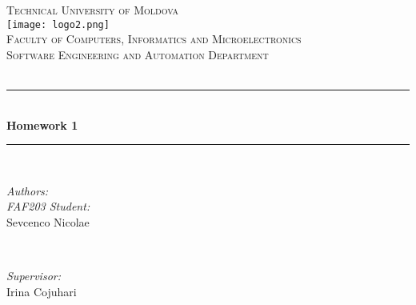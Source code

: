 \documentclass[12pt]{article}
\begin{document}
\begin{titlepage}

    \newcommand{\HRule}{\rule{\linewidth}{0.5mm}} %

    \center %


    \textsc{\LARGE Technical University of Moldova}\\[1.5cm] %
    \texttt{[image: logo2.png]}\\[1cm] %
    \textsc{\Large Faculty of Computers, Informatics and Microelectronics  \\ Software Engineering and Automation Department}\\[0.5cm] %
    \textsc{\large }\\[0.5cm] %


    \HRule \\[0.4cm]
    { \huge \bfseries Homework 1 }\\[0.4cm] %
    \HRule \\[1.5cm]


    \begin{minipage}{0.4\textwidth}
        \begin{flushleft} \large
            \emph{Authors:}\\
            \emph{FAF203 Student:}\\
            Sevcenco Nicolae \\
        \end{flushleft}
    \end{minipage}
    ~
    \begin{minipage}{0.4\textwidth}
        \begin{flushright} \large
            \emph{Supervisor:} \\
            Irina Cojuhari
        \end{flushright}
    \end{minipage} \\[2cm]


\end{titlepage}
\end{document}
